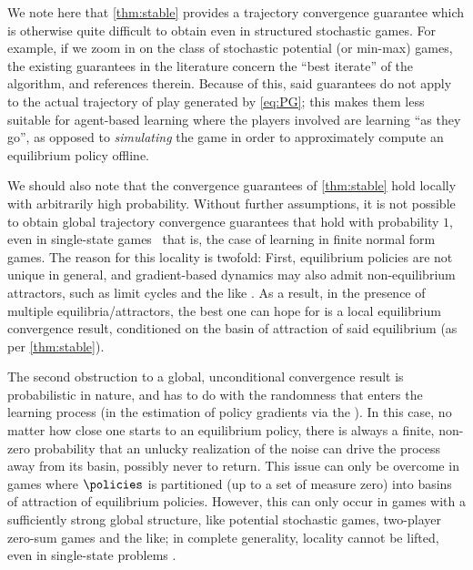 We note here that \cref{thm:stable}
provides a trajectory convergence guarantee which is otherwise quite difficult to obtain even in structured stochastic games.
For example, if we zoom in on the class of stochastic potential (or min-max) games, the existing guarantees in the literature concern the ``best iterate'' of the algorithm, \cf \cite{LOPP22,zhang2021gradient} and references therein.
Because of this, said guarantees do not apply to the actual trajectory of play generated by \eqref{eq:PG};
this makes them less suitable for agent-based learning where the players involved are learning ``as they go'', as opposed to \emph{simulating} the game in order to approximately compute an equilibrium policy offline.

We should also note that the convergence guarantees of \cref{thm:stable} hold locally with arbitrarily high probability.
Without further assumptions, it is not possible to obtain global trajectory convergence guarantees that hold with probability $1$, even in single-state games \textendash\ that is, the case of learning in finite normal form games.
\beginrev
The reason for this locality is twofold:
First, equilibrium policies are not unique in general, and gradient-based dynamics may also admit non-equilibrium attractors, such as limit cycles and the like \cite{HMC21,MPP18,MLZF+19,MHC22}.
As a result, in the presence of multiple equilibria/attractors, the best one can hope for is a local equilibrium convergence result, conditioned on the basin of attraction of said equilibrium (as per \cref{thm:stable}).

The second obstruction to a global, unconditional convergence result is probabilistic in nature, and has to do with the randomness that enters the learning process (\eg in the estimation of policy gradients via the \reinforce).
In this case, no matter how close one starts to an equilibrium policy, there is always a finite, non-zero probability that an unlucky realization of the noise can drive the process away from its basin, possibly never to return.
This issue can only be overcome in games where $\policies$ is partitioned (up to a set of measure zero) into basins of attraction of equilibrium policies.
However, this can only occur in games with a sufficiently strong global structure, like potential stochastic games, two-player zero-sum games and the like;
in complete generality, locality cannot be lifted, even in single-state problems \cite{FVGL+20,GVM21}.
\endedit


